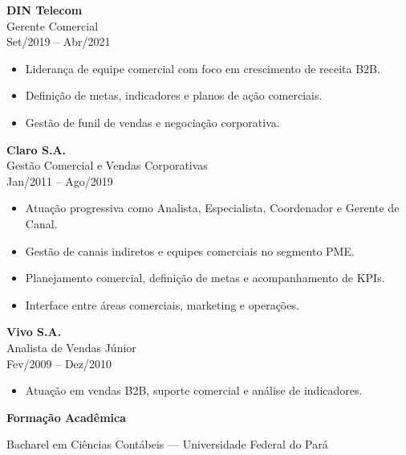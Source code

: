 \documentclass[11pt,a4paper]{article}
\begin{document}
\vspace{8pt}

\textbf{DIN Telecom} \\
Gerente Comercial \\
Set/2019 -- Abr/2021

\begin{itemize}
\item Liderança de equipe comercial com foco em crescimento de receita B2B.
\item Definição de metas, indicadores e planos de ação comerciais.
\item Gestão de funil de vendas e negociação corporativa.
\end{itemize}

\vspace{8pt}

\textbf{Claro S.A.} \\
Gestão Comercial e Vendas Corporativas \\
Jan/2011 -- Ago/2019

\begin{itemize}
\item Atuação progressiva como Analista, Especialista, Coordenador e Gerente de Canal.
\item Gestão de canais indiretos e equipes comerciais no segmento PME.
\item Planejamento comercial, definição de metas e acompanhamento de KPIs.
\item Interface entre áreas comerciais, marketing e operações.
\end{itemize}

\vspace{8pt}

\textbf{Vivo S.A.} \\
Analista de Vendas Júnior \\
Fev/2009 -- Dez/2010

\begin{itemize}
\item Atuação em vendas B2B, suporte comercial e análise de indicadores.
\end{itemize}

\vspace{12pt}

\textbf{Formação Acadêmica}

Bacharel em Ciências Contábeis --- Universidade Federal do Pará
\end{document}
